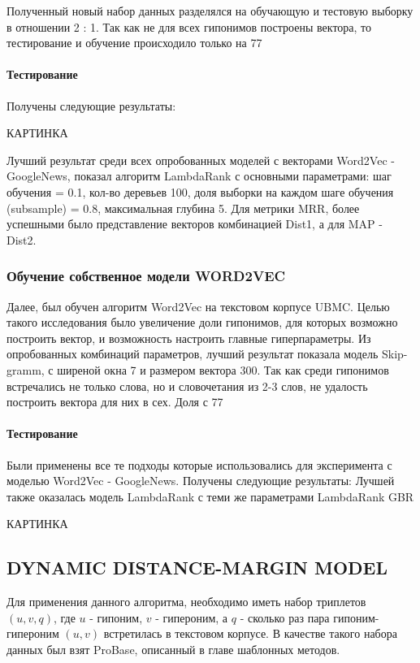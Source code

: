 Полученный новый набор данных разделялся на обучающую и тестовую выборку в
отношении 2 : 1. Так как не для всех гипонимов построены вектора, то тестирование и
обучение происходило только на 77%

\paragraph{Тестирование}

Получены следующие результаты:

КАРТИНКА

Лучший результат среди всех опробованных моделей с векторами Word2Vec - GoogleNews,
показал алгоритм LambdaRank с основными параметрами: шаг обучения = 0.1, кол-во
деревьев 100, доля выборки на каждом шаге обучения (subsample) = 0.8, максимальная
глубина 5. Для метрики MRR, более успешными было представление векторов
комбинацией Dist1, а для MAP - Dist2.

\subsubsection{Обучение собственное модели WORD2VEC}

Далее, был обучен алгоритм Word2Vec на текстовом корпусе UBMC. Целью такого
исследования было увеличение доли гипонимов, для которых возможно построить вектор,
и возможность настроить главные гиперпараметры.
Из опробованных комбинаций параметров, лучший результат показала модель Skip-gramm,
с ширеной окна 7 и размером вектора 300.
Так как среди гипонимов встречались не только слова, но и словочетания из 2-3 слов, не
удалость построить вектора для них в сех. Доля с 77%

\paragraph{Тестирование}

Были применены все те подходы которые использовались для эксперимента с моделью
Word2Vec - GoogleNews.
Получены следующие результаты:
Лучшей также оказалась модель LambdaRank с теми же параметрами
LambdaRank
GBR

КАРТИНКА



\subsection{DYNAMIC DISTANCE-MARGIN MODEL}

Для применения данного алгоритма, необходимо иметь набор триплетов $(u, v, q)$, где $u$ - гипоним, $v$ - гипероним, а $q$ - сколько раз пара гипоним-гипероним $(u, v)$ встретилась в текстовом корпусе. В качестве такого набора данных был взят ProBase, описанный в главе
шаблонных методов.

